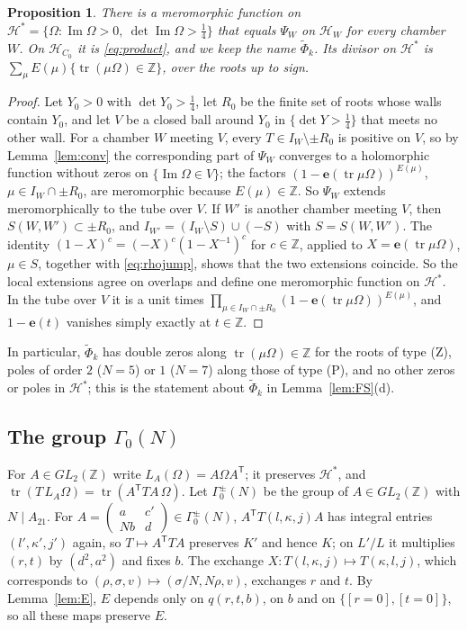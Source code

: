 \documentclass[11pt]{amsart}
\numberwithin{equation}{section}
\theoremstyle{plain}
\newtheorem{prop}[thm]{Proposition}
\theoremstyle{definition}
\theoremstyle{remark}
\newcommand{\Z}{\mathbb{Z}}
\newcommand{\e}{\mathbf{e}}
\newcommand{\tPhi}{\widetilde{\Phi}}
\newcommand{\sm}[4]{\left(\begin{smallmatrix}#1&#2\\#3&#4\end{smallmatrix}\right)}
\begin{document}
\begin{prop}\label{prop:cont}
There is a meromorphic function on $\mathcal H^*=\{\Omega:\operatorname{Im}\Omega>0,\ \det\operatorname{Im}\Omega>\frac14\}$ that equals $\Psi_W$ on $\mathcal H_W$ for every chamber $W$. On $\mathcal H_{C_0}$ it is \eqref{eq:product}, and we keep the name $\tPhi_k$. Its divisor on $\mathcal H^*$ is $\sum_\mu E(\mu)\{\operatorname{tr}(\mu\Omega)\in\Z\}$, over the roots up to sign.
\end{prop}

\begin{proof}
Let $Y_0>0$ with $\det Y_0>\frac14$, let $R_0$ be the finite set of roots whose walls contain $Y_0$, and let $V$ be a closed ball around $Y_0$ in $\{\det Y>\frac14\}$ that meets no other wall. For a chamber $W$ meeting $V$, every $T\in I_W\setminus\pm R_0$ is positive on $V$, so by Lemma~\ref{lem:conv} the corresponding part of $\Psi_W$ converges to a holomorphic function without zeros on $\{\operatorname{Im}\Omega\in V\}$; the factors $(1-\e(\operatorname{tr}\mu\Omega))^{E(\mu)}$, $\mu\in I_W\cap\pm R_0$, are meromorphic because $E(\mu)\in\Z$. So $\Psi_W$ extends meromorphically to the tube over $V$. If $W'$ is another chamber meeting $V$, then $S(W,W')\subset\pm R_0$, and $I_{W'}=(I_W\setminus S)\cup(-S)$ with $S=S(W,W')$. The identity $(1-X)^c=(-X)^c(1-X^{-1})^c$ for $c\in\Z$, applied to $X=\e(\operatorname{tr}\mu\Omega)$, $\mu\in S$, together with \eqref{eq:rhojump}, shows that the two extensions coincide. So the local extensions agree on overlaps and define one meromorphic function on $\mathcal H^*$. In the tube over $V$ it is a unit times $\prod_{\mu\in I_W\cap\pm R_0}(1-\e(\operatorname{tr}\mu\Omega))^{E(\mu)}$, and $1-\e(t)$ vanishes simply exactly at $t\in\Z$.
\end{proof}

In particular, $\tPhi_k$ has double zeros along $\operatorname{tr}(\mu\Omega)\in\Z$ for the roots of type (Z), poles of order $2$ ($N=5$) or $1$ ($N=7$) along those of type (P), and no other zeros or poles in $\mathcal H^*$; this is the statement about $\tPhi_k$ in Lemma~\ref{lem:FS}(d).

\subsection{The group $\Gamma_0(N)$}\label{app:levi}
For $A\in GL_2(\Z)$ write $L_A(\Omega)=A\Omega A^{\mathsf T}$; it preserves $\mathcal H^*$, and $\operatorname{tr}(T\,L_A\Omega)=\operatorname{tr}(A^{\mathsf T}TA\,\Omega)$. Let $\Gamma_0^\pm(N)$ be the group of $A\in GL_2(\Z)$ with $N\mid A_{21}$. For $A=\sm a{c'}{Nb}d\in\Gamma^\pm_0(N)$, $A^{\mathsf T}T(l,\kappa,j)A$ has integral entries $(l',\kappa',j')$ again, so $T\mapsto A^{\mathsf T}TA$ preserves $K'$ and hence $K$; on $L'/L$ it multiplies $(r,t)$ by $(d^2,a^2)$ and fixes $b$. The exchange $X:T(l,\kappa,j)\mapsto T(\kappa,l,j)$, which corresponds to $(\rho,\sigma,v)\mapsto(\sigma/N,N\rho,v)$, exchanges $r$ and $t$. By Lemma~\ref{lem:E}, $E$ depends only on $q(r,t,b)$, on $b$ and on $\{[r=0],[t=0]\}$, so all these maps preserve $E$.
\end{document}
